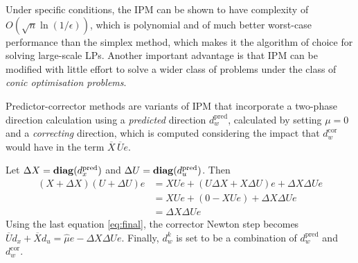 
Under specific conditions, the IPM can be shown to have complexity of $O(\sqrt{n}\ln(1/\epsilon))$, which is polynomial and of much better worst-case performance than the simplex method, which makes it the algorithm of choice for solving large-scale LPs. Another important advantage is that IPM can be modified with little effort to solve a wider class of problems under the class of \emph{conic optimisation problems}.

Predictor-corrector methods are variants of IPM that incorporate a two-phase direction calculation using a \emph{predicted} direction $d_w^{\text{pred}}$, calculated by setting $\mu=0$ and a \emph{correcting} direction, which is computed considering the impact that $d_w^{\text{cor}}$ would have in the term $\overline{X} \, \overline{U}e$.

Let $\Delta X = \mathop{\bf diag}(d_x^{\text{pred}})$ and $\Delta U = \mathop{\bf diag}(d_u^{\text{pred}})$. Then\\[-15pt]
\begin{align}
(X + \Delta X)(U + \Delta U)e &= XUe + (U \Delta X + X\Delta U)e + \Delta X \Delta U e\nonumber\\
& = XUe + (0 - XUe) + \Delta X \Delta U e\nonumber\\
& = \Delta X \Delta U e\label{eq:final}   
\end{align}
Using the last equation\hspace{-1.0pt}  \eqref{eq:final},\hspace{-1pt} the corrector Newton step becomes $\overline{U}d_x + \overline{X}d_u = \hat{\mu}e - \Delta X \Delta U e . 
$
Finally, $d_w^{k}$ is set to be a combination of $d_w^{\text{pred}}$ and $d_w^{\text{cor}}$. 
